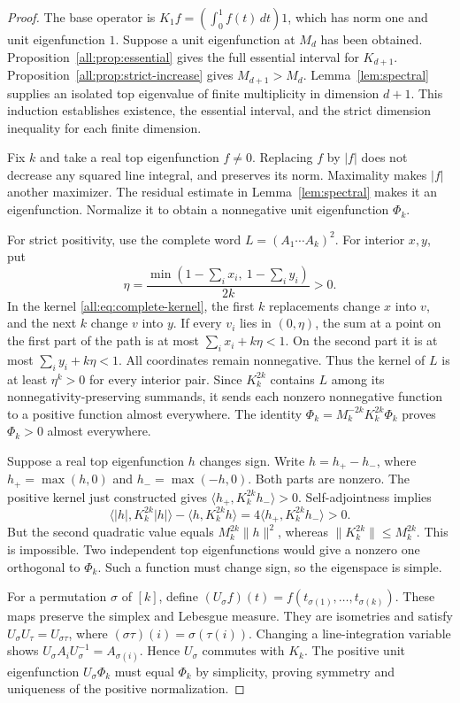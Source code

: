 \documentclass[11pt]{article}
\begin{document}
\begin{proof}
The base operator is
$K_1f=(\int_0^1f(t)\,dt)1$, which has norm one and unit eigenfunction $1$.
Suppose a unit eigenfunction at $M_d$ has been obtained.
Proposition~\ref{all:prop:essential} gives the full essential interval for
$K_{d+1}$.  Proposition~\ref{all:prop:strict-increase} gives
$M_{d+1}>M_d$.
Lemma~\ref{lem:spectral} supplies an isolated top eigenvalue of finite
multiplicity in dimension $d+1$.
This induction establishes existence, the essential interval, and the
strict dimension inequality for each finite dimension.

Fix $k$ and take a real top eigenfunction $f\ne0$.
Replacing $f$ by $|f|$ does not decrease any squared line integral, and
preserves its norm.  Maximality makes $|f|$ another maximizer.
The residual estimate in Lemma~\ref{lem:spectral} makes it an eigenfunction.
Normalize it to obtain a nonnegative unit eigenfunction $\Phi_k$.

For strict positivity, use the complete word
$L=(A_1\cdots A_k)^2$.
For interior $x,y$, put
\[
 \eta=\frac{\min(1-\sum_i x_i,\ 1-\sum_i y_i)}{2k}>0.
\]
In the kernel \eqref{all:eq:complete-kernel}, the first $k$ replacements
change $x$ into $v$, and the next $k$ change $v$ into $y$.
If every $v_i$ lies in $(0,\eta)$, the sum at a point on the first
part of the path is at most $\sum_i x_i+k\eta<1$.
On the second part it is at most $\sum_i y_i+k\eta<1$.
All coordinates remain nonnegative.
Thus the kernel of $L$ is at least $\eta^k>0$ for every interior pair.
Since $K_k^{2k}$ contains $L$ among its nonnegativity-preserving summands,
it sends each nonzero nonnegative function to a positive function almost
everywhere.  The identity $\Phi_k=M_k^{-2k}K_k^{2k}\Phi_k$ proves
$\Phi_k>0$ almost everywhere.

Suppose a real top eigenfunction $h$ changes sign.
Write $h=h_+-h_-$, where $h_+=\max(h,0)$ and $h_-=\max(-h,0)$.
Both parts are nonzero.  The positive kernel just constructed gives
$\langle h_+,K_k^{2k}h_-\rangle>0$.
Self-adjointness implies
\[
 \langle |h|,K_k^{2k}|h|\rangle-\langle h,K_k^{2k}h\rangle
 =4\langle h_+,K_k^{2k}h_-\rangle>0.
\]
But the second quadratic value equals $M_k^{2k}\|h\|^2$, whereas
$\|K_k^{2k}\|\leq M_k^{2k}$.  This is impossible.
Two independent top eigenfunctions would give a nonzero one orthogonal
to $\Phi_k$.  Such a function must change sign, so the eigenspace is simple.

For a permutation $\sigma$ of $[k]$, define
$(U_\sigma f)(t)=f(t_{\sigma(1)},\ldots,t_{\sigma(k)})$.
These maps preserve the simplex and Lebesgue measure.
They are isometries and satisfy $U_\sigma U_\tau=U_{\sigma\tau}$,
where $(\sigma\tau)(i)=\sigma(\tau(i))$.
Changing a line-integration variable shows
$U_\sigma A_iU_\sigma^{-1}=A_{\sigma(i)}$.
Hence $U_\sigma$ commutes with $K_k$.
The positive unit eigenfunction $U_\sigma\Phi_k$ must equal $\Phi_k$ by
simplicity, proving symmetry and uniqueness of the positive normalization.
\end{proof}
\end{document}
